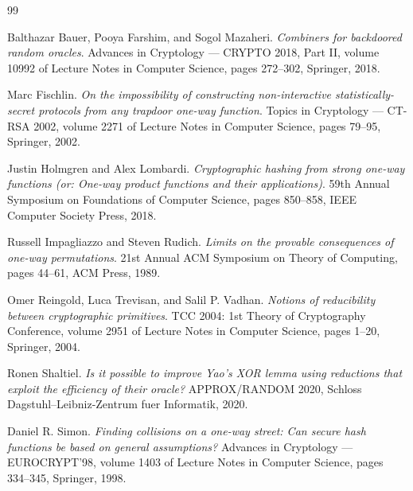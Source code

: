 \documentclass{aicr-conjecture}
\begin{document}
\begin{aicrbibliography}{99}

Balthazar Bauer, Pooya Farshim, and Sogol Mazaheri.
\emph{Combiners for backdoored random oracles}.
Advances in Cryptology --- CRYPTO 2018, Part II, volume 10992 of Lecture
Notes in Computer Science, pages 272--302, Springer, 2018.

Marc Fischlin.
\emph{On the impossibility of constructing non-interactive
statistically-secret protocols from any trapdoor one-way function}.
Topics in Cryptology --- CT-RSA 2002, volume 2271 of Lecture Notes in
Computer Science, pages 79--95, Springer, 2002.

Justin Holmgren and Alex Lombardi.
\emph{Cryptographic hashing from strong one-way functions (or: One-way
product functions and their applications)}.
59th Annual Symposium on Foundations of Computer Science, pages
850--858, IEEE Computer Society Press, 2018.

Russell Impagliazzo and Steven Rudich.
\emph{Limits on the provable consequences of one-way permutations}.
21st Annual ACM Symposium on Theory of Computing, pages 44--61, ACM
Press, 1989.

Omer Reingold, Luca Trevisan, and Salil P. Vadhan.
\emph{Notions of reducibility between cryptographic primitives}.
TCC 2004: 1st Theory of Cryptography Conference, volume 2951 of Lecture
Notes in Computer Science, pages 1--20, Springer, 2004.

Ronen Shaltiel.
\emph{Is it possible to improve Yao's XOR lemma using reductions that
exploit the efficiency of their oracle?}
APPROX/RANDOM 2020, Schloss Dagstuhl--Leibniz-Zentrum fuer Informatik,
2020.

Daniel R. Simon.
\emph{Finding collisions on a one-way street: Can secure hash functions
be based on general assumptions?}
Advances in Cryptology --- EUROCRYPT'98, volume 1403 of Lecture Notes in
Computer Science, pages 334--345, Springer, 1998.

\end{aicrbibliography}
\end{document}
